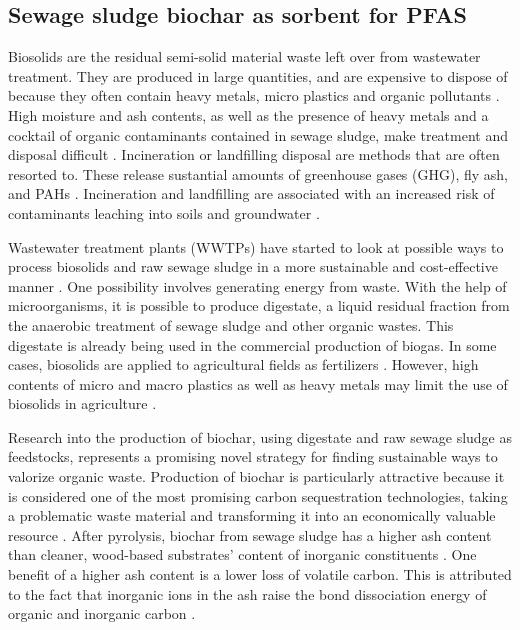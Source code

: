 \subsection{Sewage sludge biochar as sorbent for PFAS}
Biosolids are the residual semi-solid material waste left over from wastewater treatment. They are produced in large quantities, and are expensive to dispose of because they often contain heavy metals, micro plastics and organic pollutants \citep{Raheem2018}. High moisture and ash contents, as well as the presence of heavy metals and a cocktail of organic contaminants contained in sewage sludge, make treatment and disposal difficult \citep{Li2019}. Incineration or landfilling disposal are methods that are often resorted to. These release sustantial amounts of greenhouse gases (\acrshort{GHG}), fly ash, and \acrshort{PAHs} \citep{huang2022comparative}. Incineration and landfilling are associated with an increased risk of contaminants leaching into soils and groundwater \citep{propp2021organic}. 

Wastewater treatment plants (WWTPs) have started to look at possible ways to process biosolids and raw sewage sludge in a more sustainable and cost-effective manner \citep{Raheem2018}. One possibility involves generating energy from waste. With the help of microorganisms, it is possible to produce digestate, a liquid residual fraction from the anaerobic treatment of sewage sludge and other organic wastes. This digestate is already being used in the commercial production of biogas. In some cases, biosolids are applied to agricultural fields as fertilizers \citep{moodie2021legacy}. However, high contents of micro and macro plastics as well as heavy metals may limit the use of biosolids in agriculture \citep{mohajerani2020microplastics}.

Research into the production of biochar, using digestate and raw sewage sludge as feedstocks, represents a promising novel strategy for finding sustainable ways to valorize organic waste. Production of biochar is particularly attractive because it is considered one of the most promising carbon sequestration technologies, taking a problematic waste material and transforming it into an economically valuable resource \citep{arvaniti2014sorption}. After pyrolysis, biochar from sewage sludge has a higher ash content than cleaner, wood-based substrates' content of inorganic constituents \citep{fan2020using}. One benefit of a higher ash content is a lower loss of volatile carbon. This is attributed to the fact that inorganic ions in the ash raise the bond dissociation energy of organic and inorganic carbon \citep{Cantrell2012}. 

